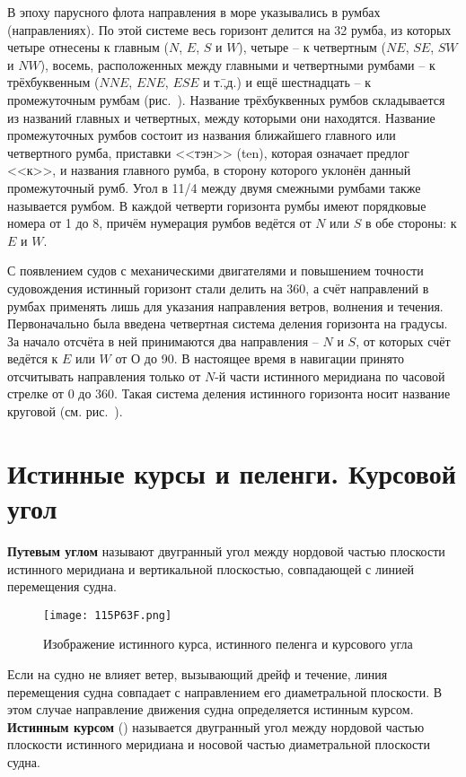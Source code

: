 В эпоху парусного флота направления в море указывались в румбах
(направлениях). По этой системе весь горизонт делится на 32 румба, из
которых четыре отнесены к главным ($N$, $E$, $S$ и $W$), четыре \--- к
четвертным ($NE$, $SE$, $SW$ и $NW$), восемь, расположенных между
главными и четвертными румбами \--- к трёхбуквенным ($NNE$, $ENE$,
$ESE$ и т.\=,д.) и ещё шестнадцать \--- к промежуточным румбам
(рис.~). Название трёхбуквенных румбов складывается из
названий главных и четвертных, между которыми они находятся. Название
промежуточных румбов состоит из названия ближайшего главного или
четвертного румба, приставки <<тэн>> (ten), которая означает предлог
<<к>>, и названия главного румба, в сторону которого уклонён данный
промежуточный румб. Угол в 11/4 между двумя смежными румбами
также называется румбом. В каждой четверти горизонта румбы имеют
порядковые номера от 1 до 8, причём нумерация румбов ведётся от $N$
или $S$ в обе стороны: к $E$ и $W$.

С появлением судов с механическими двигателями и повышением точности
судовождения истинный горизонт стали делить на 360\gr, а счёт
направлений в румбах применять лишь для указания направления ветров,
волнения и течения. Первоначально была введена четвертная система
деления горизонта на градусы. За начало отсчёта в ней принимаются два
направления \--- $N$ и $S$, от которых счёт ведётся к $E$ или $W$ от О
до 90\gr. В настоящее время в навигации принято отсчитывать
направления только от $N$-й части истинного меридиана по часовой
стрелке от 0 до 360\gr. Такая система деления истинного горизонта
носит название круговой (см. рис.~).

\section{Истинные курсы и пеленги. Курсовой угол} 

\textbf{Путевым углом} называют двугранный угол
между нордовой частью плоскости истинного меридиана и вертикальной
плоскостью, совпадающей с линией перемещения судна.

\begin{figure}[htb]
  \centering{}
  \texttt{[image: 115P63F.png]} %
  \caption{Изображение истинного курса, истинного пеленга и курсового угла}
  \label{fig:N8}
\end{figure}

Если на судно не влияет ветер, вызывающий дрейф и течение, линия
перемещения судна совпадает с направлением его диаметральной
плоскости. В этом случае направление движения судна определяется
истинным курсом. \textbf{Истинным курсом} (\IK) называется двугранный
угол между нордовой частью плоскости истинного меридиана и носовой
частью диаметральной плоскости судна.

